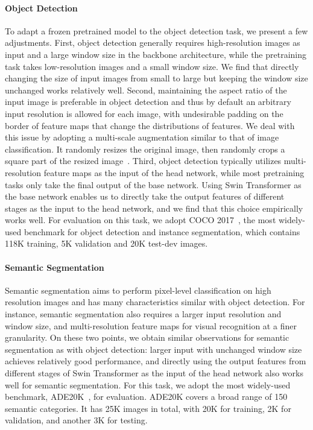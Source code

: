 \documentclass{article}
\begin{document}
\paragraph{Object Detection} To adapt a frozen pretrained model to the object detection task, we present a few adjustments. First, object detection generally requires high-resolution images as input and a large window size in the backbone architecture, while the pretraining task takes low-resolution images and a small window size. We find that directly changing the size of input images from small to large but keeping the window size unchanged works relatively well.
Second, maintaining the aspect ratio of the input image is preferable in object detection and thus by default an arbitrary input resolution is allowed for each image, with undesirable padding on the border of feature maps that change the distributions of features. 
We deal with this issue by adopting a multi-scale augmentation similar to that of image classification. It randomly resizes the original image, then randomly crops a square part of the resized image~\cite{simple_copy_paste}.
Third, object detection typically utilizes multi-resolution feature maps as the input of the head network, while most pretraining tasks only take the final output of the base network. Using Swin Transformer as the base network enables us to directly take the output features of different stages as the input to the head network, and we find that this choice empirically works well. For evaluation on this task, we adopt COCO 2017~\cite{lin2014coco}, the most widely-used benchmark for object detection and instance segmentation, which contains 118K training, 5K validation and 20K test-dev images.

\paragraph{Semantic Segmentation} Semantic segmentation aims to perform pixel-level classification on high resolution images and has many characteristics similar with object detection. For instance, semantic segmentation also requires a larger input resolution and window size, and multi-resolution feature maps for visual recognition at a finer granularity. On these two points, we obtain similar observations for semantic segmentation as with object detection: larger input with unchanged window size achieves relatively good performance, and directly using the output features from different stages of Swin Transformer as the input of the head network also works well for semantic segmentation. For this task, we adopt the most widely-used benchmark, ADE20K~\cite{zhou2018ade}, for evaluation. ADE20K covers a broad range of 150 semantic categories. It has 25K images in total, with 20K for training, 2K for validation, and another 3K for testing. 
\end{document}
